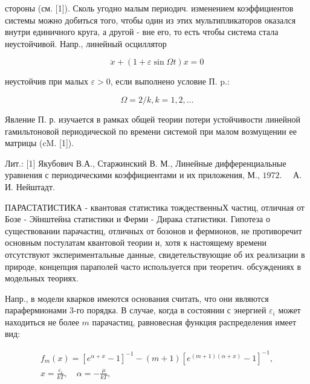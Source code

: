 \documentclass[10pt]{article}
\begin{document}
стороны (см. [1]). Сколь угодно малым периодич. изменением коэффициентов системы можно добиться того, чтобы один из этих мультипликаторов оказался внутри единичного круга, а другой - вне его, то есть чтобы система стала неустойчивой. Напр., линейный осциллятор



\[

\ddot{x}+(1+\varepsilon \sin \Omega t) x=0

\]



неустойчив при малых $\varepsilon>0$, если выполнено условие П. p.:



\[

\Omega=2 / k, k=1,2, \ldots

\]



Явление П. р. изучается в рамках общей теории потери устойчивости линейной гамильтоновой периодической по времени системой при малом возмущении ее матрицы (cM. [1]).



Лит.: [1] Якубович В.А., Старжинский В. М., Линейные дифференциальные уравнения с периодическими коэффициентами и их приложения, М., $1972 . \quad$ А. И. Нейштадт.



ПАРАСТАТИСТИКА - квантовая статистика тождественныХ частиц, отличная от Бозе - Эйнштейна статистики и Ферми - Дирака статистики. Гипотеза о существовании парачастиц, отличных от бозонов и фермионов, не противоречит основным постулатам квантовой теории и, хотя к настоящему времени отсутствуют экспериментальные данные, свидетельствующие об их реализации в природе, концепция параполей часто используется при теоретич. обсуждениях в модельных теориях.



Напр., в модели кварков имеются основания считать, что они являются парафермионами 3-го порядка. В случае, когда в состоянии с энергией $\varepsilon_{i}$ может находиться не более $m$ парачастиц, равновесная функция распределения имеет вид:



\[

\begin{gathered}

f_{m}(x)=\left[e^{\alpha+x}-1\right]^{-1}-(m+1)\left[e^{(m+1)(\alpha+x)}-1\right]^{-1}, \\

x=\frac{\varepsilon_{i}}{k T}, \quad \alpha=-\frac{\mu}{k T},

\end{gathered}

\]
\end{document}
